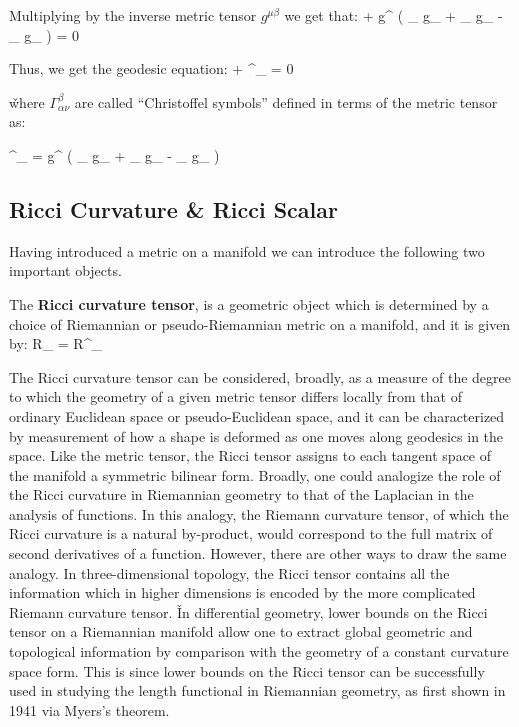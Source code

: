 Multiplying by the inverse metric tensor $g^{\mu \beta}$ we get that:
\bse
\ddot{\gamma^{\beta}} +  g^{\mu \beta} \left( \partial _{\mu } g_{\alpha \nu }
+ \partial _{\nu } g_{\mu \alpha } - \partial _{\alpha } g_{\mu \nu } \right) \dot{\gamma^{\alpha}}
\dot{\gamma^{\nu}} = 0
\ese

Thus, we get the geodesic equation:
\bse
\ddot{\gamma^{\beta}} + \Gamma^{\beta}_{\alpha \nu} \dot{\gamma^{\alpha}} \dot{\gamma^{\nu}} = 0
\ese

\v
where $\Gamma^{\beta}_{\alpha \nu}$ are called ``Christoffel symbols'' defined in terms of the metric tensor as:

\bse
\Gamma^{\beta}_{\alpha \nu} =  g^{\mu \beta} \left( \partial_{\mu } g_{\alpha \nu }
+ \partial _{\nu } g_{\mu \alpha } - \partial _{\alpha } g_{\mu \nu } \right)
\ese

\subsection{Ricci Curvature \& Ricci Scalar}

Having introduced a metric on a manifold we can introduce the following two important objects.

The \textbf{Ricci curvature tensor}, is a geometric object which is determined by a choice of Riemannian or
pseudo-Riemannian metric on a manifold, and it is given by:
\bse
R_{\mu \nu} = R^{\alpha}_{\mu \alpha \nu}
\ese
\ed

The Ricci curvature tensor can be considered, broadly, as a measure of the degree to which the geometry of a given
metric tensor differs locally from that of ordinary Euclidean space or pseudo-Euclidean space, and it can be
characterized by measurement of how a shape is deformed as one moves along geodesics in the space. Like the metric
tensor, the Ricci tensor assigns to each tangent space of the manifold a symmetric bilinear form. Broadly, one could
analogize the role of the Ricci curvature in Riemannian geometry to that of the Laplacian in the analysis of
functions. In this analogy, the Riemann curvature tensor, of which the Ricci curvature is a natural by-product, would
correspond to the full matrix of second derivatives of a function. However, there are other ways to draw the same
analogy. In three-dimensional topology, the Ricci tensor contains all the information which in higher dimensions
is encoded by the more complicated Riemann curvature tensor. \v

In differential geometry, lower bounds on the Ricci tensor on a Riemannian manifold allow one to extract global
geometric and topological information by comparison with the geometry of a constant curvature space form. This is
since lower bounds on the Ricci tensor can be successfully used in studying the length functional in Riemannian
geometry, as first shown in 1941 via Myers's theorem.

